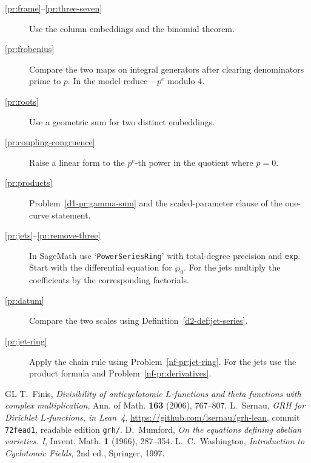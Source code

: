 \documentclass[reqno]{amsart}
\theoremstyle{plain}
\theoremstyle{definition}
\theoremstyle{remark}
\begin{document}
\begin{description}
\item[\ref{pr:frame}--\ref{pr:three-seven}] Use the column embeddings and the binomial theorem.
\item[\ref{pr:frobenius}] Compare the two maps on integral generators after clearing denominators prime to \(p\).  In the model reduce \(-p^e\) modulo \(4\).
\item[\ref{pr:roots}] Use a geometric sum for two distinct embeddings.
\item[\ref{pr:coupling-congruence}] Raise a linear form to the \(p^e\)-th power in the quotient where \(p=0\).
\item[\ref{pr:products}] Problem~\ref{d1-pr:gamma-sum} and the scaled-parameter clause of the one-curve statement.
\item[\ref{pr:jets}--\ref{pr:remove-three}] In SageMath use `\texttt{PowerSeriesRing}' with total-degree precision and \texttt{exp}.  Start with the differential equation for \(\wp_0\).  For the jets multiply the coefficients by the corresponding factorials.
\item[\ref{pr:datum}] Compare the two scales using Definition~\ref{d2-def:jet-series}.
\item[\ref{pr:jet-ring}] Apply the chain rule using Problem~\ref{nf-pr:jet-ring}.  For the jets use the product formula and Problem~\ref{nf-pr:derivatives}.
\end{description}

\begin{thebibliography}{GL}
 T.~Finis, \emph{Divisibility of anticyclotomic \(L\)-functions and theta functions with complex multiplication}, Ann. of Math.  \textbf{163} (2006), 767--807.
 L.~Sernau, \emph{GRH for Dirichlet \(L\)-functions, in Lean~4}, \url{https://github.com/lsernau/grh-lean}, commit \texttt{72fead1}, readable edition \texttt{grh/}.
 D.~Mumford, \emph{On the equations defining abelian varieties.  I}, Invent.  Math.  \textbf{1} (1966), 287--354.
 L.~C.~Washington, \emph{Introduction to Cyclotomic Fields}, 2nd ed., Springer, 1997.
\end{thebibliography}
\end{document}
